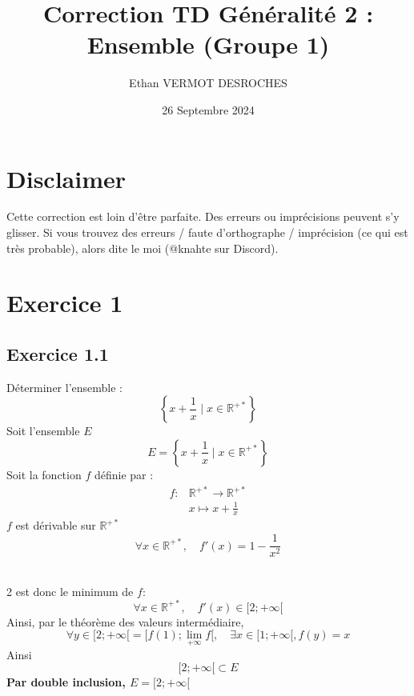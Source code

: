 \documentclass[a4paper,12pt]{article}
\title{\textbf{Correction TD Généralité 2 : Ensemble (Groupe 1)}}
\author{Ethan VERMOT DESROCHES}
\date{26 Septembre 2024}
\begin{document}
\maketitle
\thispagestyle{fancy}
\section*{Disclaimer}
Cette correction est loin d'être parfaite. Des erreurs ou imprécisions peuvent s'y glisser. Si vous trouvez des erreurs / faute d’orthographe / imprécision (ce qui est très probable), alors dite le moi (@knahte sur Discord).
\tableofcontents
\newpage

\section{Exercice 1}
\subsection{Exercice 1.1}
Déterminer l'ensemble :
\[
\left\{ x + \frac{1}{x} \mid x \in \mathbb{R}^{+*} \right\}
\]
Soit l'ensemble $E$
\[
E = \left\{ x + \frac{1}{x} \mid x \in \mathbb{R}^{+*} \right\}
\]
Soit la fonction $f$ définie par :
\[
\begin{aligned}
f :& \mathbb{R}^{+*} \to \mathbb{R}^{+*}
\\
& x \mapsto x + \frac{1}{x}
\end{aligned}
\]
$f$ est dérivable sur $\mathbb{R}^{+*}$
\[
\forall x \in \mathbb{R}^{+*}, \quad f'(x) = 1 - \frac{1}{x^2}
\]

\\
2 est donc le minimum de $f$:
\[
\forall x \in \mathbb{R}^{+*}, \quad f'(x) \in [ 2; +\infty[
\]
Ainsi, par le théorème des valeurs intermédiaire,
\[
\forall y \in[ 2; +\infty[ = [ f(1); \lim_{+\infty} f [ ,\quad \exists x \in [ 1; +\infty[, f(y) = x
\]
Ainsi
\[
[ 2 ; + \infty [ \subset E
\]
\textbf{Par double inclusion, $E = [ 2 ; + \infty [$}
\end{document}
